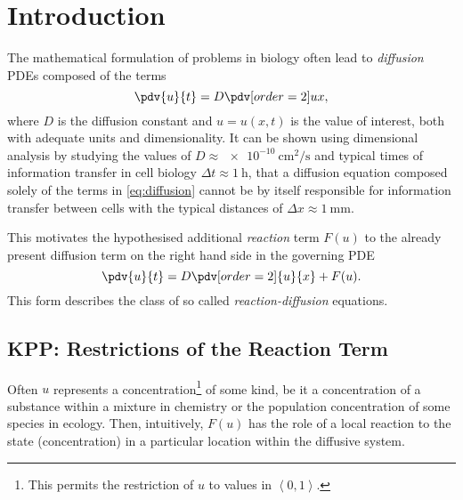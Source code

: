 \maketitle \vspace{-2em} \noindent\hrulefill

\section{Introduction}%
\label{sec:introduction}

The mathematical formulation of problems in biology often lead to \emph{diffusion} \acp{PDE} composed of the terms
    \begin{equation} \label{eq:diffusion}
            \pdv{u}{t} = D  \pdv[order={2}]{u}{x},
    \end{equation} where \(D\) is the diffusion constant and \(u = u(x,t)\) is the value of interest, both with adequate 
    units and dimensionality.
It can be shown using dimensional analysis by studying the values of \(D \approx \qty{e-10}{\cm \squared \per \s}\) and 
    typical times of information transfer in cell biology \( \Delta t \approx \qty{1}{\hour}\), that a diffusion 
    equation composed solely of the terms in \cref{eq:diffusion} cannot be by itself responsible for information transfer 
    between cells with the typical distances of \( \Delta x \approx\qty{1}{\milli\meter}\).

This motivates the hypothesised additional \emph{reaction} term \(F(u)\) to the already present diffusion term on
    the right hand side in the governing \ac{PDE} \begin{equation}
        \pdv{u}{t} = D \pdv[order=2]{u}{x} + F(u).
    \end{equation}
This form describes the class of so called \emph{reaction-diffusion} equations.

\subsection{\acs{KPP}: Restrictions of the Reaction Term}%
\label{sub:properties-of-the-reaction-term}

Often \(u\) represents a concentration\footnote{This permits the restriction of \(u\) to values in 
    \(\left< 0,1 \right>\).} of some kind, be it a concentration of a substance within a mixture in chemistry or the 
    population concentration of some species in ecology.
Then, intuitively, \(F(u)\) has the role of a local reaction to the state (concentration) in a particular location 
    within the diffusive system.

